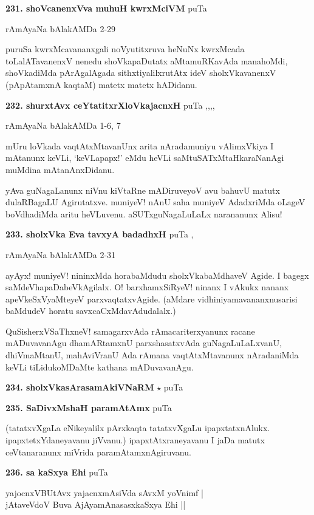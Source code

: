 \medskip
\noindent\textbf{231. shoVcanenxVva muhuH kwrxMciVM} \hfill puTa \pageref{203c}

\hfill rAmAyaNa bAlakAMDa 2-29

puruSa kwrxMcavananxgali noVyutitxruva heNuNx kwrxMcada toLalATavanenxV nenedu shoVkapaDutatx aMtamuRKavAda manahoMdi, shoVkadiMda pArAgalAgada sithxtiyalilxrutAtx ideV sholxVkavanenxV (pApAtamxnA kaqtaM) matetx matetx hADidanu.

\medskip
\noindent\textbf{232. shurxtAvx ceYtatitxrXloVkajacnxH} \hfill puTa \pageref{153c},\pageref{163d},\pageref{194c},\pageref{246b},\pageref{251b}

\hfill rAmAyaNa bAlakAMDa 1-6, 7

mUru loVkada vaqtAtxMtavanUnx arita nAradamuniyu vAlimxVkiya I mAtanunx keVLi, `keVLapapx!' eMdu heVLi saMtuSATxMtaHkaraNanAgi muMdina mAtanAnxDidanu.

yAva guNagaLanunx niVnu kiVtaRne mADiruveyoV avu bahuvU matutx dulaRBagaLU Agirutatxve. muniyeV! nAnU saha muniyeV AdadxriMda oLageV boVdhadiMda aritu heVLuvenu. aSUTxguNagaLuLaLx narananunx Alisu!

\medskip
\noindent\textbf{233. sholxVka Eva tavxyA badadhxH} \hfill puTa \pageref{157c},\pageref{181c}

\hfill rAmAyaNa bAlakAMDa 2-31

ayAyx! muniyeV! nininxMda horabaMdudu sholxVkabaMdhaveV Agide. I bagegx saMdeVhapaDabeVkAgilalx. O! barxhamxSiRyeV! ninanx I vAkukx  nananx apeVkeSxVyaMteyeV parxvaqtatxvAgide. (aMdare vidhiniyamavananxnusarisi baMdudeV horatu savxcaCxMdavAdudalalx.)

QuSisherxVSaThxneV! samagarxvAda rAmacariterxyanunx racane mADuvavanAgu dhamARtamxnU parxshasatxvAda guNagaLuLaLxvanU, dhiVmaMtanU, mahAviVranU Ada rAmana vaqtAtxMtavanunx nAradaniMda keVLi tiLidukoMDaMte kathana mADuvavanAgu. 

\medskip
\noindent\textbf{234. sholxVkasArasamAkiVNaRM} $\star$ \hfill puTa \pageref{152b}

\medskip
\noindent\textbf{235. SaDivxMshaH paramAtAmx} \hfill puTa \pageref{185}

(tatatxvXgaLa eNikeyalilx pArxkaqta tatatxvXgaLu ipapxtatxnAlukx. ipapxtetxYdaneyavanu jiVvanu.) ipapxtAtxraneyavanu I jaDa matutx ceVtanaranunx miVrida paramAtamxnAgiruvanu. 

\medskip
\noindent\textbf{236. sa kaSxya Ehi} \hfill puTa \pageref{162a}

\begin{shloka}
yajocnxVBUtAvx yajacnxmAsiVda sAvxM yoVnimf |\\
jAtaveVdoV Buva AjAyamAnasasxkaSxya Ehi ||
\end{shloka} 

